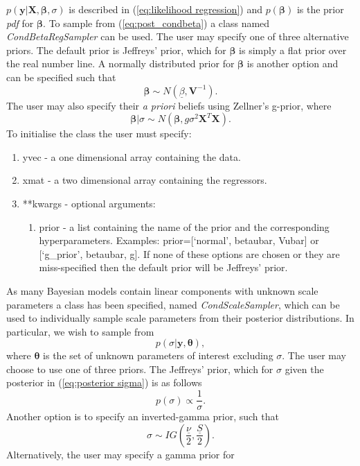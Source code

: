\documentclass[article]{jss}
\begin{document}
$p(\bm{y}|\bm{X},\bm{\beta},\sigma)$ is described in
(\ref{eq:likelihood regression}) and $p(\bm{\beta})$ is the prior
\emph{pdf} for $\bm{\beta}.$ To sample from (\ref{eq:post_condbeta}) a
class named \emph{CondBetaRegSampler} can be used. The user may
specify one of three alternative priors.  The default prior is
Jeffreys' prior, which for $\bm{\beta}$ is simply a flat prior over
the real number line. A normally distributed prior for $\bm{\beta}$ is
another option and can be specified such that\[ \bm{\beta}\sim
N\left(\underline{\beta},\bm{V}^{-1}\right).\] The user may also
specify their \emph{a priori} beliefs using Zellner's g-prior, where\[
\bm{\beta}|\sigma\sim
N\left(\bm{\beta},g\sigma^{2}\bm{X}^{T}\bm{X}\right).\] To initialise
the class the user must specify:
\begin{enumerate}
\item yvec - a one dimensional  array containing the data. 
\item xmat - a two dimensional  array containing the regressors. 
\item {*}{*}kwargs - optional arguments:

\begin{enumerate}
\item prior - a list containing the name of the prior and the
  corresponding hyperparameters. Examples: prior={[}`normal',
  betaubar, Vubar{]} or {[}`g\_prior', betaubar, g{]}. If none of
  these options are chosen or they are miss-specified then the default
  prior will be Jeffreys' prior.
\end{enumerate}
\end{enumerate}
As many Bayesian models contain linear components with unknown scale
parameters a class has been specified, named \emph{CondScaleSampler},
which can be used to individually sample scale parameters from their
posterior distributions. In particular, we wish to sample from
\begin{equation} p(\sigma|\bm{y},\bm{\theta}),\label{eq:posterior
    sigma}\end{equation} where $\bm{\theta}$ is the set of unknown
parameters of interest excluding $\sigma.$ The user may choose to use
one of three priors.  The Jeffreys' prior, which for $\sigma$ given
the posterior in (\ref{eq:posterior sigma}) is as follows \[
p(\sigma)\propto\frac{1}{\sigma}.\] Another option is to specify an
inverted-gamma prior, such that\[ \sigma\sim
IG\left(\frac{\underline{\nu}}{2},\frac{\underline{S}}{2}\right).\]
Alternatively, the user may specify a gamma prior for
\end{document}
